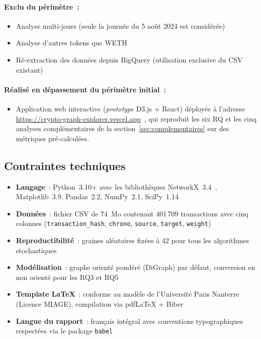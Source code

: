 \paragraph{Exclu du p\'erim\`etre~:}
\begin{itemize}
  \item Analyse multi-jours (seule la journ\'ee du 5 ao\^ut 2024 est consid\'er\'ee)
  \item Analyse d'autres tokens que WETH
  \item R\'e-extraction des donn\'ees depuis BigQuery (utilisation exclusive du CSV existant)
\end{itemize}

\paragraph{R\'ealis\'e en d\'epassement du p\'erim\`etre initial~:}
\begin{itemize}
  \item Application web interactive (\textit{prototype} D3.js + React)
    d\'eploy\'ee \`a l'adresse \url{https://crypto-graph-explorer.vercel.app}~\cite{cryptographexplorer_web},
    qui reproduit les six RQ et les cinq analyses compl\'ementaires de la
    section~\ref{sec:complementaires} sur des m\'etriques pr\'e-calcul\'ees.
\end{itemize}


\subsection{Contraintes techniques}

\begin{itemize}
  \item \textbf{Langage}~: Python~3.10+ avec les biblioth\`eques NetworkX~3.4~\cite{networkx_docs}, Matplotlib~3.9, Pandas~2.2, NumPy~2.1, SciPy~1.14
  \item \textbf{Donn\'ees}~: fichier CSV de 74~Mo contenant 401\,709 transactions avec cinq colonnes (\texttt{transaction\_hash}, \texttt{chrono}, \texttt{source}, \texttt{target}, \texttt{weight})
  \item \textbf{Reproductibilit\'e}~: graines al\'eatoires fix\'ees \`a 42 pour tous les algorithmes stochastiques
  \item \textbf{Mod\'elisation}~: graphe orient\'e pond\'er\'e (DiGraph) par d\'efaut, conversion en non orient\'e pour les RQ3 et RQ5
  \item \textbf{Template LaTeX}~: conforme au mod\`ele de l'Universit\'e Paris Nanterre (Licence MIAGE), compilation via pdfLaTeX + Biber
  \item \textbf{Langue du rapport}~: fran\c{c}ais int\'egral avec conventions typographiques respect\'ees via le package \texttt{babel}
\end{itemize}

